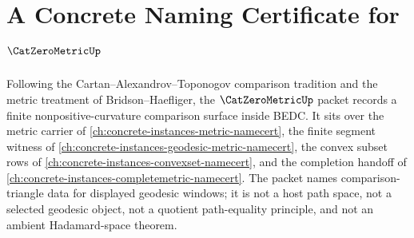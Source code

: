 \chapter{A Concrete Naming Certificate for $\CatZeroMetricUp$}
\label{ch:concrete-instances-cat-zero-metric-namecert}

Following the Cartan--Alexandrov--Toponogov comparison tradition and the metric treatment of Bridson--Haefliger, the $\CatZeroMetricUp$ packet records a finite nonpositive-curvature comparison surface inside BEDC. It sits over the metric carrier of \autoref{ch:concrete-instances-metric-namecert}, the finite segment witness of \autoref{ch:concrete-instances-geodesic-metric-namecert}, the convex subset rows of \autoref{ch:concrete-instances-convexset-namecert}, and the completion handoff of \autoref{ch:concrete-instances-completemetric-namecert}. The packet names comparison-triangle data for displayed geodesic windows; it is not a host path space, not a selected geodesic object, not a quotient path-equality principle, and not an ambient Hadamard-space theorem.

